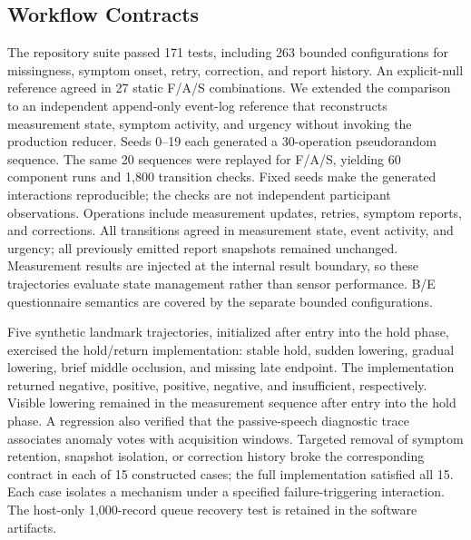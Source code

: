 \subsection{Workflow Contracts}
The repository suite passed 171 tests, including 263 bounded configurations
for missingness, symptom onset, retry, correction, and report history. An
explicit-null reference agreed in 27 static F/A/S combinations. We extended the
comparison to an independent append-only event-log reference that reconstructs
measurement state, symptom activity, and urgency without invoking the production
reducer. Seeds 0--19 each generated a 30-operation pseudorandom sequence. The same 20 sequences were replayed for F/A/S, yielding 60 component runs and 1,800 transition checks. Fixed seeds make the generated interactions reproducible; the checks are not independent participant observations. Operations include measurement updates,
retries, symptom reports, and corrections. All transitions agreed in measurement
state, event activity, and urgency; all previously emitted report snapshots remained
unchanged. Measurement results are injected at the internal result boundary, so
these trajectories evaluate state management rather than sensor performance.
B/E questionnaire semantics are covered by the separate bounded configurations.


Five synthetic landmark trajectories, initialized after entry into the hold phase, exercised the hold/return implementation:
stable hold, sudden lowering, gradual lowering, brief middle occlusion, and
missing late endpoint. The implementation returned negative, positive,
positive, negative, and insufficient, respectively. Visible lowering remained
in the measurement sequence after entry into the hold phase. A regression
also verified that the passive-speech diagnostic trace associates anomaly votes
with acquisition windows. Targeted removal of symptom retention, snapshot isolation, or correction history broke the corresponding contract in each of 15 constructed cases; the full implementation satisfied all 15. Each case isolates a mechanism under a specified failure-triggering interaction. The host-only 1,000-record queue recovery test is retained in the software artifacts.
